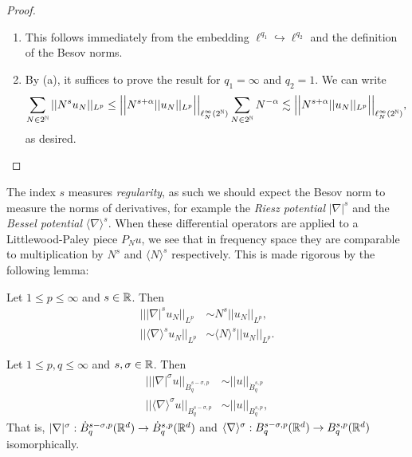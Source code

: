 \begin{proof}
\leavevmode
\begin{enumerate}
	\item This follows immediately from the embedding $\ell^{q_1} \hookrightarrow \ell^{q_2}$ and the definition of the Besov norms. 
	
	\item By (a), it suffices to prove the result for $q_1 = \infty$ and $q_2 = 1$. We can write
		\begin{align*}
			 \sum_{N \in 2^\mathbb N}   ||N^s u_N||_{L^p} 
				&\leq  \Big| \Big| N^{s + \alpha} ||u_N||_{L^p} \Big|\Big|_{\ell^\infty_N (2^\mathbb N)}  \sum_{N \in 2^\mathbb N}  N^{-\alpha}  \lesssim \Big| \Big| N^{s + \alpha} ||u_N||_{L^p} \Big|\Big|_{\ell^\infty_N (2^\mathbb N)},
		\end{align*}	
		as desired. 
\end{enumerate}
\end{proof}

The index $s$ measures \textit{regularity}, as such we should expect the Besov norm to measure the norms of derivatives, for example the \emph{Riesz potential} $|\nabla|^s$ and the \emph{Bessel potential} $\langle \nabla \rangle^s$. When these differential operators are applied to a Littlewood-Paley piece $P_N u$, we see that in frequency space they are comparable to multiplication by $N^s$ and $\langle N\rangle^s$ respectively. This is made rigorous by the following lemma: 

\begin{lemma} Let $1 \leq p \leq \infty$ and $s \in \mathbb R$. Then 
				\begin{align*}
					|| |\nabla|^s u_N||_{L^p} 
						&\sim N^s ||u_N||_{L^p}, \\
					|| \langle\nabla\rangle^s u_{N}||_{L^p} 
						&\sim \langle N\rangle^s ||u_{N}||_{L^p}.
				\end{align*}			
\end{lemma}

\begin{proposition}
	Let $1 \leq p , q\leq \infty$ and $s, \sigma \in \mathbb R$. Then 
		\begin{align*}
			|||\nabla|^\sigma u||_{\dot B^{s - \sigma, p}_q}
				&\sim ||u||_{\dot B^{s, p}_q}\\
			 || \langle \nabla \rangle^\sigma u ||_{B^{s - \sigma, p}_q} 
			 	&\sim ||u||_{B^{s, p}_q} ,
		\end{align*}	 
	That is, $|\nabla|^\sigma : 	\dot B^{s - \sigma, p}_q (\mathbb R^d) \to \dot B^{s, p}_q (\mathbb R^d)$ and $\langle \nabla \rangle^\sigma : 	B^{s - \sigma, p}_q (\mathbb R^d) \to B^{s, p}_q (\mathbb R^d)$ isomorphically. 
\end{proposition}

